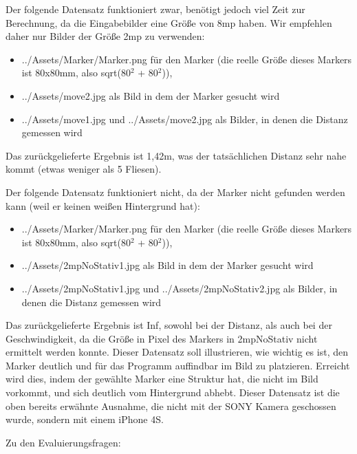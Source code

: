 \documentclass[deutsch]{scrartcl}
\begin{document}
Der folgende Datensatz funktioniert zwar, benötigt jedoch viel Zeit zur Berechnung, da die Eingabebilder eine Größe von 8mp haben. Wir empfehlen daher nur Bilder der Größe 2mp zu verwenden:
\begin{itemize}
	\item ../Assets/Marker/Marker.png für den Marker (die reelle Größe dieses Markers ist 80x80mm, also sqrt(80$^2$ + 80$^2$)), 
	\item ../Assets/move2.jpg als Bild in dem der Marker gesucht wird
	\item ../Assets/move1.jpg und ../Assets/move2.jpg als Bilder, in denen die Distanz gemessen wird
\end{itemize}
Das zurückgelieferte Ergebnis ist 1,42m, was der tatsächlichen Distanz sehr nahe kommt (etwas weniger als 5 Fliesen).

Der folgende Datensatz funktioniert nicht, da der Marker nicht gefunden werden kann (weil er keinen weißen Hintergrund hat):
\begin{itemize}
	\item ../Assets/Marker/Marker.png für den Marker (die reelle Größe dieses Markers ist 80x80mm, also sqrt(80$^2$ + 80$^2$)), 
	\item ../Assets/2mpNoStativ1.jpg als Bild in dem der Marker gesucht wird
	\item ../Assets/2mpNoStativ1.jpg und ../Assets/2mpNoStativ2.jpg als Bilder, in denen die Distanz gemessen wird
\end{itemize}
Das zurückgelieferte Ergebnis ist Inf, sowohl bei der Distanz, als auch bei der Geschwindigkeit, da die Größe in Pixel des Markers in 2mpNoStativ nicht ermittelt werden konnte. Dieser Datensatz soll illustrieren, wie wichtig es ist, den Marker deutlich und für das Programm auffindbar im Bild zu platzieren. Erreicht wird dies, indem der gewählte Marker eine Struktur hat, die nicht im Bild vorkommt, und sich deutlich vom Hintergrund abhebt.
Dieser Datensatz ist die oben bereits erwähnte Ausnahme, die nicht mit der SONY Kamera geschossen wurde, sondern mit einem iPhone 4S.

Zu den Evaluierungsfragen:
\end{document}
